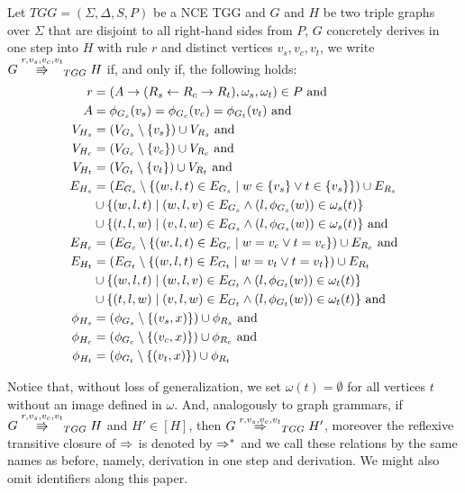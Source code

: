 \documentclass[runningheads]{llncs}
\begin{document}
\begin{definition}
	\label{def:tgg_dstep}
	Let $TGG = (\Sigma, \Delta, S, P)$ be a NCE TGG and $G$ and $H$ be two triple graphs over $\Sigma$ that are disjoint to all right-hand sides from $P$, $G$ concretely derives in one step into $H$ with rule $r$ and distinct vertices $v_s, v_c, v_t$, we write $G \tcderiv{r}{v_s,v_c,v_t}{TGG} H$ if, and only if, the following holds:
	\begin{align*}
		r & = (A \to (R_s \overset{}{\leftarrow} R_c \overset{}{\rightarrow} R_t), \omega_s, \omega_t) \in P \text{ and } \\
		A & = \phi_{G_s}(v_s) = \phi_{G_c}(v_c) = \phi_{G_t}(v_t) \text{ and}\\
		V_{H_s}  & = (V_{G_s} \setminus \{v_s\}) \cup V_{R_s} \text{ and}\\
		V_{H_c}  & = (V_{G_c} \setminus \{v_c\}) \cup V_{R_c} \text{ and}\\
		V_{H_t}  & = (V_{G_t} \setminus \{v_t\}) \cup V_{R_t} \text{ and}\\
		E_{H_s} & = (E_{G_s} \setminus \{(w,l,t) \in E_{G_s} \; | \; w \in \{v_s\} \lor t \in \{v_s\} \}) \cup E_{R_s} \\
		& \cup \{(w,l,t) \; | \; (w,l,v) \in E_{G_s} \land (l,\phi_{G_s}(w)) \in \omega_{s}(t)\} \\
		& \cup \{(t,l,w) \; | \; (v,l,w) \in E_{G_s} \land (l,\phi_{G_s}(w)) \in \omega_{s}(t)\} \text{ and} \\
		E_{H_c} & = (E_{G_c} \setminus \{(w,l,t) \in E_{G_c} \; | \; w = v_c \lor t = v_c \}) \cup E_{R_c} \text{ and} \\
		E_{H_t} & = (E_{G_t} \setminus \{(w,l,t) \in E_{G_t} \; | \; w = v_t \lor t = v_t \}) \cup E_{R_t} \\
		& \cup \{(w,l,t) \; | \; (w,l,v) \in E_{G_t} \land (l,\phi_{G_t}(w)) \in \omega_{t}(t)\} \\
		& \cup \{(t,l,w) \; | \; (v,l,w) \in E_{G_t} \land (l,\phi_{G_t}(w)) \in \omega_{t}(t)\} \text{ and} \\
		\phi_{H_s} & = (\phi_{G_s} \setminus \{(v_s,x)\}) \cup \phi_{R_s} \text{ and}\\
		\phi_{H_c} & = (\phi_{G_c} \setminus \{(v_c,x)\}) \cup \phi_{R_c} \text{ and}\\
		\phi_{H_t} & = (\phi_{G_t} \setminus \{(v_t,x)\}) \cup \phi_{R_t}\\
	\end{align*}
\end{definition}

Notice that, without loss of generalization, we set $\omega(t) = \emptyset$ for all vertices $t$ without an image defined in $\omega$. And, analogously to graph grammars, if $G \cderiv{r}{v_s,v_c,v_t}{TGG} H$ and $H' \in [H]$, then $G \tderiv{r}{v_s,v_c,v_t}{TGG} H'$, moreover the reflexive transitive closure of $\tderiv{}{}{}$ is denoted by $\tderivtr{}{}{}$ and we call these relations by the same names as before, namely, derivation in one step and derivation. We might also omit identifiers along this paper.
\end{document}
